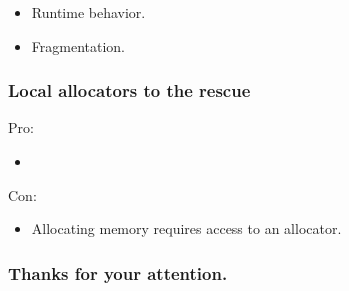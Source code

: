 \documentclass[aspectratio=169]{beamer}
\begin{document}
\begin{frame}[fragile]
\begin{itemize}
\item Runtime behavior.
    \item Fragmentation.
    \end{itemize}
\end{frame}

\begin{frame}[fragile]
  \frametitle{Local allocators to the rescue}
    Pro:
    \begin{itemize}
    \item 
    \end{itemize}

    Con:
    \begin{itemize}
    \item Allocating memory requires access to an allocator.
    \end{itemize}
\end{frame}
\fi

\begin{frame}
  \frametitle{Thanks for your attention.}
\end{frame}
\end{document}
